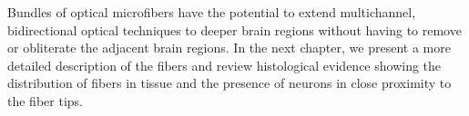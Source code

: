 Bundles of optical microfibers have the potential to 
extend multichannel, bidirectional optical techniques to 
deeper brain regions without having to remove or obliterate 
the adjacent brain regions. In the next chapter, we 
present a more detailed description of the fibers and 
review histological evidence showing the distribution 
of fibers in tissue and the presence of neurons in close 
proximity to the fiber tips.
